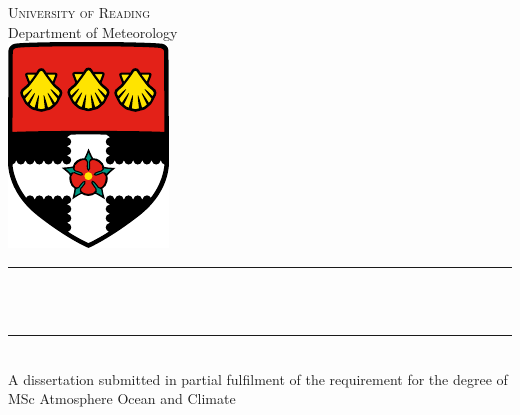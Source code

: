 \begin{titlingpage}
\makeatletter
\begin{center}
\textsc{\Large University of Reading} \\[12pt]
{\Large Department of Meteorology} \\[16pt]
\includegraphics{uor-logo} \\[48pt]

\rule{\textwidth}{.4pt} \\[12pt]
{ \huge \bfseries \@title \\[16pt] } \rule{\textwidth}{.4pt} \\[54pt]
{\LARGE \@author}
\vfill
A dissertation submitted in partial fulfilment of the requirement for the degree of MSc Atmosphere Ocean and Climate \\[48pt]
{\Large \@date}
\end{center}
\makeatother
\end{titlingpage}
